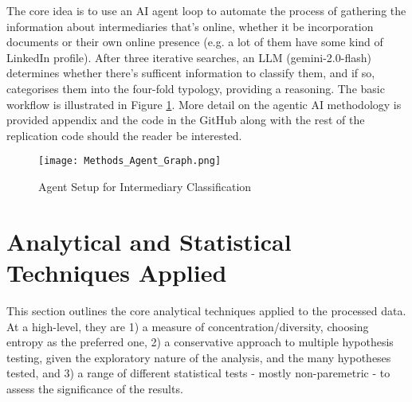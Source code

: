 The core idea is to use an AI agent loop to automate the process of gathering the information about intermediaries that's online, whether it be incorporation documents or their own online presence (e.g. a lot of them have some kind of LinkedIn profile). After three iterative searches, an LLM (gemini-2.0-flash) determines whether there's sufficent information to classify them, and if so, categorises them into the four-fold typology, providing a reasoning. The basic workflow is illustrated in Figure \ref{fig:agent_loop_placeholder}. More detail on the agentic AI methodology is provided appendix and the code in the GitHub along with the rest of the replication code should the reader be interested.

\begin{figure}[htbp]
    \centering
    \texttt{[image: Methods\_Agent\_Graph.png]}
    \caption{Agent Setup for Intermediary Classification}
    \label{fig:agent_loop_placeholder}
\end{figure}

\section{Analytical and Statistical Techniques Applied}
\label{sec:3_3_analytical_methodologies}

This section outlines the core analytical techniques applied to the processed data. At a high-level, they are 1) a measure of concentration/diversity, choosing entropy as the preferred one, 2) a conservative approach to multiple hypothesis testing, given the exploratory nature of the analysis, and the many hypotheses tested, and 3) a range of different statistical tests - mostly non-paremetric - to assess the significance of the results.

